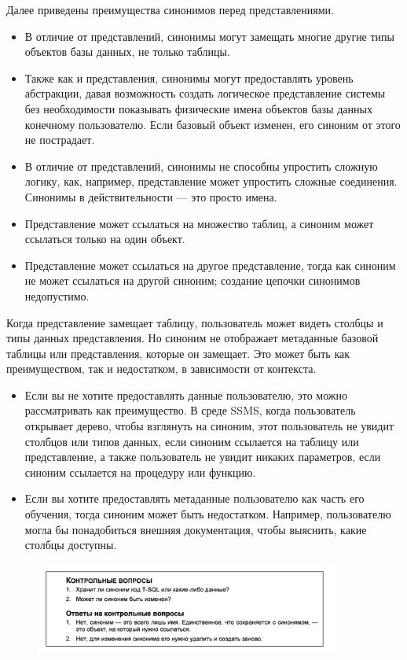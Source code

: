 Далее приведены преимущества синонимов перед представлениями. 
\begin{itemize}
	\item В отличие от представлений, синонимы могут замещать многие другие типы
	объектов базы данных, не только таблицы. 
	\item Также как и представления, синонимы могут предоставлять уровень абстракции,
	давая возможность создать логическое представление системы без необходимости показывать физические имена объектов базы данных конечному пользователю. Если базовый объект изменен, его синоним от этого не пострадает. 
	\item В отличие от представлений, синонимы не способны упростить сложную логику, как, например, представление может упростить сложные соединения. Синонимы в действительности — это просто имена. 
	\item Представление может ссылаться на множество таблиц, а синоним может ссылаться только на один объект. 
	\item Представление может ссылаться на другое представление, тогда как синоним
	не может ссылаться на другой синоним; создание цепочки синонимов недопустимо. 
\end{itemize}

Когда представление замещает таблицу, пользователь может видеть столбцы и типы данных представления. Но синоним не отображает метаданные базовой таблицы
или представления, которые он замещает. Это может быть как преимуществом, так
и недостатком, в зависимости от контекста.

\begin{itemize}
	\item Если вы не хотите предоставлять данные пользователю, это можно рассматривать как преимущество. В среде SSMS, когда пользователь открывает дерево,
	чтобы взглянуть на синоним, этот пользователь не увидит столбцов или типов
	данных, если синоним ссылается на таблицу или представление, а также пользователь не увидит никаких параметров, если синоним ссылается на процедуру
	или функцию.
	\item Если вы хотите предоставлять метаданные пользователю как часть его обучения,
	тогда синоним может быть недостатком. Например, пользователю могла бы понадобиться внешняя документация, чтобы выяснить, какие столбцы доступны. 
\end{itemize}

\begin{figure}[h!]
	\begin{center}
		\includegraphics[width=0.9\textwidth]{img/control20.png}
	\end{center}
	\captionsetup{justification=centering}
\end{figure}


